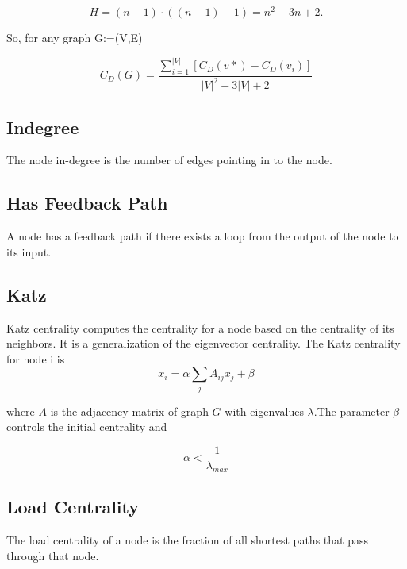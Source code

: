 \documentclass{tum-book}
\begin{document}
                \begin{equation}
                    H=(n-1)\cdot ((n-1)-1)=n^{2}-3n+2.
                \end{equation}
            
            \noindent
            So, for any graph G:=(V,E)
            
                \begin{equation}
                    C_{D}(G)={\frac {\sum _{i=1}^{|V|}[C_{D}(v*)-C_{D}(v_{i})]}{|V|^{2}-3|V|+2}}
                \end{equation}

            
            \subsection{Indegree}
            The node in-degree is the number of edges pointing in to the node.
            
            \subsection{Has Feedback Path}
            A node has a feedback path if there exists a loop from the output of the node to its input.
    
            \subsection{Katz}
            Katz centrality computes the centrality for a node based on the centrality of its neighbors. It is a generalization of the eigenvector centrality. The Katz centrality for node i is
                \begin{equation}
                x_i=\alpha\sum_{j}A_{ij}x_j+\beta
                \end{equation}
            
                \bigskip\noindent where $A$ is the adjacency matrix of graph $G$ with eigenvalues $\lambda$.The parameter $\beta$ controls the initial centrality and
            
                \begin{equation}
                \alpha<\frac{1}{\lambda_{max}}
                \end{equation}
    
            \subsection{Load Centrality}
            The load centrality of a node is the fraction of all shortest paths that pass through that node.
    
\end{document}
